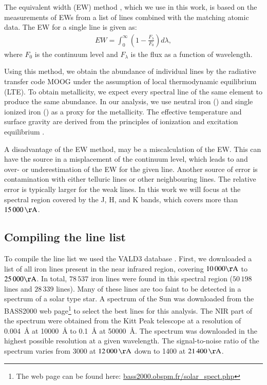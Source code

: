 \documentclass{aa}
\begin{document}
The equivalent width (EW) method
\citep[see e.g.][]{Sousa2008a,Mucciarelli2013,Bensby2014}, which we use
in this work, is based on the measurements of EWs from a list of lines
combined with the matching atomic data. The EW for a single line is
given as:
\begin{align}
    \label{eq:EW}
    EW = \int_0^\infty \left(1 - \frac{F_\lambda}{F_0}\right) d\lambda,
\end{align}
where $F_0$ is the continuum level and $F_\lambda$ is the flux as a
function of wavelength.

Using this method, we obtain the abundance of individual lines
by the radiative transfer code MOOG \citep[][version 2013]{Sneden1973}
under the assumption of local thermodynamic equilibrium (LTE).
To obtain metallicity, we expect every spectral line of the same
element to produce the same abundance. In our analysis, we use neutral
iron () and single ionized iron () as a proxy
for the metallicity. The effective temperature and surface gravity
are derived from the principles of ionization and excitation equilibrium
\citep[see][]{Gray2006}.


A disadvantage of the EW method, may be a miscalculation of the EW. This
can have the source in a misplacement of the continuum level, which
leads to and over- or underestimation of the EW for the given line.
Another source of error is contamination with either telluric lines or
other neighbouring lines. The relative error is typically larger for the weak lines.
In this work we will focus at the spectral region covered by the J, H,
and K bands, which covers more than $\SI{15000}{\AA}$.



\subsection{Compiling the line list}

To compile the line list we used the VALD3 database \citep{VALD1,VALD2}.
First, we downloaded a list of all iron lines present in the near
infrared region, covering $10\,000\si{\AA}$ to $25\,000\si{\AA}$.
In total, $78\,537$ iron lines were found in this spectral region
($50\,198$  lines and $28\,339$  lines).
Many of these lines are too faint to be detected in a spectrum
of a solar type star. A spectrum of the Sun was downloaded from
the BASS2000 web page\footnote{The web page can be found here:
\url{bass2000.obspm.fr/solar_spect.php}} to select the best lines for this analysis. The
NIR part of the spectrum were obtained
from the Kitt Peak telescope \citep{Hinkle1995} at a resolution of
\SI{0.004}{\angstrom} at \SI{10000}{\angstrom} to \SI{0.1}{\angstrom}
at \SI{50000}{\angstrom}. The spectrum was downloaded in the highest
possible resolution at a given wavelength. The signal-to-noise ratio of the spectrum varies
from 3000 at $\SI{12000}{\AA}$ down to 1400 at $\SI{21400}{\AA}$.
\end{document}
